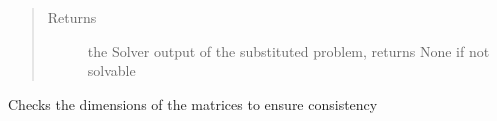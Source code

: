 \documentclass[letterpaper,10pt,english]{sphinxmanual}
\begin{document}
\begin{fulllineitems}
\begin{fulllineitems}
\begin{quote}
\begin{description}
\item[{Returns}] \leavevmode
\sphinxAtStartPar
the Solver output of the substituted problem, returns None if not solvable

\end{description}\end{quote}

\end{fulllineitems}


\begin{fulllineitems}
\label{\detokenize{mpo:mpo.mp_program.MPLP_Program.warnings}}
\sphinxAtStartPar
Checks the dimensions of the matrices to ensure consistency

\end{fulllineitems}


\end{fulllineitems}

\end{document}
